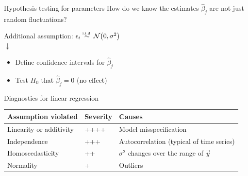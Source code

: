 \begin{frame}{Hypothesis testing for parameters}
    How do we know the \alert{estimates} $\hat{\beta}_{j}$ are not just random
    fluctuations?
    \vfill\pause
    \begin{center}
        Additional assumption: $\epsilon_{i} \overset{\text{\tiny i.i.d.}}{\sim} \mathcal{N}\!\left( 0, \sigma^{2} \right)$ \\[\bigskipamount]
        $\downarrow$ \\[\bigskipamount]
    \end{center}
    \begin{itemize}
        \item Define confidence intervals for $\hat{\beta}_{j}$
        \item Test $H_{0}$ that $\hat{\beta}_{j} = 0$ (no effect)
    \end{itemize}
\end{frame}

\begin{frame}{Diagnostics for linear regression}
    \begin{center}
        \begin{tabular}{llp{}}
            \toprule
            \textbf{Assumption violated} & \textbf{Severity} & \textbf{Causes} \\
            \midrule
            Linearity or additivity & ++++ & Model misspecification \\[\medskipamount]
            Independence            & +++  & Autocorrelation \newline (typical of time series) \\[\medskipamount]
            Homoscedasticity        & ++   & $\sigma^{2}$ changes over the range of $\vec{y}$ \\[\medskipamount]
            Normality               & +    & Outliers \\
            \bottomrule
        \end{tabular}
    \end{center}
\end{frame}

